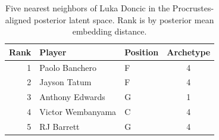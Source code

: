 \begin{table}[htbp]
  \centering\small
  \begin{tabular}{rllc}
    \toprule
    Rank & Player & Position & Archetype \\
    \midrule
    1 & Paolo Banchero & F & 4 \\
    2 & Jayson Tatum & F & 4 \\
    3 & Anthony Edwards & G & 1 \\
    4 & Victor Wembanyama & C & 4 \\
    5 & RJ Barrett & G & 4 \\
    \bottomrule
  \end{tabular}
  \caption{Five nearest neighbors of Luka Doncic in the Procrustes-aligned posterior latent space. Rank is by posterior mean embedding distance.}
  \label{tab:Luka_Doncic_neighbors}
\end{table}

